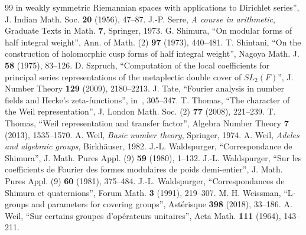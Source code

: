 \documentclass[11pt]{article}
\numberwithin{equation}{section}
\theoremstyle{plain}
\theoremstyle{definition}
\theoremstyle{remark}
\begin{document}
\begin{thebibliography}{99}
in weakly symmetric Riemannian spaces with applications to Dirichlet
series'', J. Indian Math. Soc. \textbf{20} (1956), 47--87.
 J.-P. Serre, \emph{A course in arithmetic}, Graduate Texts in
Math. \textbf{7}, Springer, 1973.
 G. Shimura, ``On modular forms of half integral weight'',
Ann. of Math. (2) \textbf{97} (1973), 440--481.
 T. Shintani, ``On the construction of holomorphic cusp
forms of half integral weight'', Nagoya Math. J. \textbf{58} (1975),
83--126.
 D. Szpruch, ``Computation of the local coefficients for
principal series representations of the metaplectic double cover of
$SL_2(F)$'', J. Number Theory \textbf{129} (2009), 2180--2213.
 J. Tate, ``Fourier analysis in number fields and Hecke's
zeta-functions'', in~\cite{CF}, 305--347.
 T. Thomas, ``The character of the Weil
representation'', J. London Math. Soc. (2) \textbf{77} (2008), 221--239.
 T. Thomas, ``Weil representation and transfer
factor'', Algebra Number Theory \textbf{7} (2013), 1535--1570.
 A. Weil, \emph{Basic number theory}, Springer, 1974.
 A. Weil, \emph{Adeles and algebraic groups}, Birkh\"auser, 1982.
 J.-L. Waldspurger, ``Correspondance de Shimura'', J. Math.
Pures Appl. (9) \textbf{59} (1980), 1--132.
 J.-L. Waldspurger, ``Sur les coefficients de Fourier
des formes modulaires de poids demi-entier'', J. Math. Pures Appl. (9)
\textbf{60} (1981), 375--484.
 J.-L. Waldspurger, ``Correspondances de Shimura et
quaternions'', Forum Math. \textbf{3} (1991), 219--307.
 M. H. Weissman, ``L-groups and parameters for covering
groups'', Ast\'erisque \textbf{398} (2018), 33--186.
 A. Weil, ``Sur certains groupes d'op\'erateurs
unitaires'', Acta Math. \textbf{111} (1964), 143--211.
\end{thebibliography}
\end{document}
